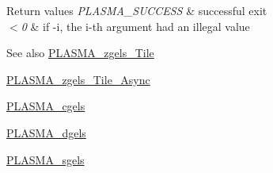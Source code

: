\begin{DoxyRetVals}{Return values}
{\em P\+L\+A\+S\+M\+A\+\_\+\+S\+U\+C\+C\+E\+S\+S} & successful exit \\
\hline
{\em $<$0} & if -\/i, the i-\/th argument had an illegal value\\
\hline
\end{DoxyRetVals}
\begin{DoxySeeAlso}{See also}
\hyperlink{group__PLASMA__Complex64__t__Tile_ga2bb601838348c183a781a1ec00023065_ga2bb601838348c183a781a1ec00023065}{P\+L\+A\+S\+M\+A\+\_\+zgels\+\_\+\+Tile} 

\hyperlink{group__PLASMA__Complex64__t__Tile__Async_gaef149ecf3716aec86c4da1b4ab4974f9_gaef149ecf3716aec86c4da1b4ab4974f9}{P\+L\+A\+S\+M\+A\+\_\+zgels\+\_\+\+Tile\+\_\+\+Async} 

\hyperlink{group__PLASMA__Complex32__t_ga047c51e0c630ac15b2679b8352013f7b_ga047c51e0c630ac15b2679b8352013f7b}{P\+L\+A\+S\+M\+A\+\_\+cgels} 

\hyperlink{group__double_ga4bfc0cdaf567c26828f484e54d457d92_ga4bfc0cdaf567c26828f484e54d457d92}{P\+L\+A\+S\+M\+A\+\_\+dgels} 

\hyperlink{group__float_ga2bbab59e86acca698a73c5bc8023e5c3_ga2bbab59e86acca698a73c5bc8023e5c3}{P\+L\+A\+S\+M\+A\+\_\+sgels} 
\end{DoxySeeAlso}
\hypertarget{group__PLASMA__Complex64__t_ga1a0f8d759e535f9947ae11baa0af6fa3_ga1a0f8d759e535f9947ae11baa0af6fa3}{}
